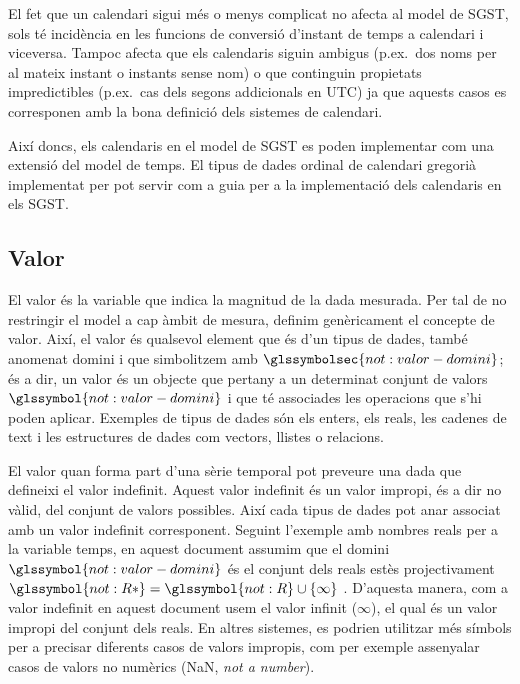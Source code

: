 El fet que un calendari sigui més o menys complicat no afecta al
model de \gls{SGST}, sols té incidència en les funcions de conversió
d'instant de temps a calendari i viceversa. Tampoc afecta que els
calendaris siguin ambigus (p.ex.\ dos noms per al mateix instant o
instants sense nom) o que continguin propietats impredictibles (p.ex.\
cas dels segons addicionals en \gls{UTC}) ja que aquests casos es
corresponen amb la bona definició dels sistemes de calendari.

Així doncs, els calendaris en el model de \gls{SGST} es poden implementar
com una extensió del model de temps. El tipus de dades ordinal de
calendari gregorià implementat per
\textcite[cap.~16]{date02:_tempor_data_relat_model} pot servir com a
guia per a la implementació dels calendaris en els \gls{SGST}.




\subsection{Valor}
\label{sec:sgst:valor}

El valor és la variable que indica la magnitud de la dada
mesurada. Per tal de no restringir el model a cap àmbit de mesura,
definim genèricament el concepte de valor. Així, el valor és qualsevol
element que és d'un tipus de dades, també anomenat domini i que
simbolitzem amb $\glssymbolsec{not:valor-domini}$; és a dir, un valor
és un objecte que pertany a un determinat conjunt de valors
$\glssymbol{not:valor-domini}$ i que té associades les operacions que
s'hi poden aplicar. Exemples de tipus de dades són els enters, els
reals, les cadenes de text i les estructures de dades com vectors,
llistes o relacions.



El valor quan forma part d'una sèrie temporal pot preveure una dada
que defineixi el valor indefinit.  Aquest valor indefinit és un valor
impropi, és a dir no vàlid, del conjunt de valors possibles. Així cada
tipus de dades pot anar associat amb un valor indefinit corresponent.
Seguint l'exemple amb nombres reals per a la variable temps, en aquest
document assumim que el domini $\glssymbol{not:valor-domini}$ és el
conjunt dels reals estès projectivament $\glssymbol{not:R*} =
\glssymbol{not:R} \cup
\{\infty\}$ \parencite{cantrell:projectivelyextendedreal}.  D'aquesta
manera, com a valor indefinit en aquest document usem el valor infinit
($\infty$), el qual és un valor impropi del conjunt dels reals.  En
altres sistemes, es podrien utilitzar més símbols per a precisar
diferents casos de valors impropis, com per exemple assenyalar casos
de valors no numèrics (NaN, \emph{not a number}).



